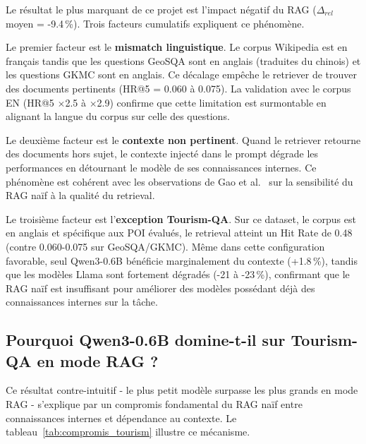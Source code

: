 \documentclass[12pt,a4paper]{article}
\begin{document}
Le r\'esultat le plus marquant de ce projet est l'impact n\'egatif du RAG ($\Delta_{rel}$ moyen = -9.4\,\%). Trois facteurs cumulatifs expliquent ce ph\'enom\`ene.

Le premier facteur est le \textbf{mismatch linguistique}. Le corpus Wikipedia est en fran\c{c}ais tandis que les questions GeoSQA sont en anglais (traduites du chinois) et les questions GKMC sont en anglais. Ce d\'ecalage emp\^eche le retriever de trouver des documents pertinents (HR@5 = 0.060 \`a 0.075). La validation avec le corpus EN (HR@5 $\times$2.5 \`a $\times$2.9) confirme que cette limitation est surmontable en alignant la langue du corpus sur celle des questions.

Le deuxi\`eme facteur est le \textbf{contexte non pertinent}. Quand le retriever retourne des documents hors sujet, le contexte inject\'e dans le prompt d\'egrade les performances en d\'etournant le mod\`ele de ses connaissances internes. Ce ph\'enom\`ene est coh\'erent avec les observations de Gao et al.~\cite{gao2023ragsurvey} sur la sensibilit\'e du RAG na\"if \`a la qualit\'e du retrieval.

Le troisi\`eme facteur est l'\textbf{exception Tourism-QA}. Sur ce dataset, le corpus est en anglais et sp\'ecifique aux POI \'evalu\'es, le retrieval atteint un Hit Rate de 0.48 (contre 0.060-0.075 sur GeoSQA/GKMC). M\^eme dans cette configuration favorable, seul Qwen3-0.6B b\'en\'eficie marginalement du contexte (+1.8\,\%), tandis que les mod\`eles Llama sont fortement d\'egrad\'es (-21 \`a -23\,\%), confirmant que le RAG na\"if est insuffisant pour am\'eliorer des mod\`eles poss\'edant d\'ej\`a des connaissances internes sur la t\^ache.


\subsection{Pourquoi Qwen3-0.6B domine-t-il sur Tourism-QA en mode RAG ?}

Ce résultat contre-intuitif - le plus petit modèle surpasse les plus grands en 
mode RAG - s'explique par un compromis fondamental du RAG naïf entre connaissances 
internes et dépendance au contexte. Le tableau~\ref{tab:compromis_tourism} illustre 
ce mécanisme.
\end{document}
